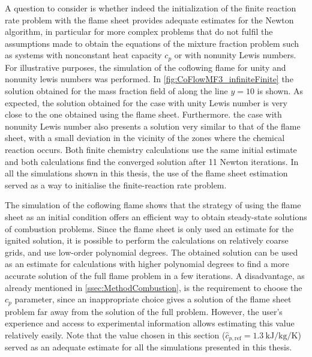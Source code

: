 A question to consider is whether indeed the initialization of the finite reaction rate problem with the flame sheet provides adequate estimates for the Newton algorithm, in particular for more complex problems that do not fulfil the assumptions made to obtain the equations of the mixture fraction problem such as systems with nonconstant heat capacity $c_p$ or with nonunity Lewis numbers. 
For illustrative purposes, the simulation of the coflowing flame for unity and nonunity lewis numbers was performed. In \cref{fig:CoFlowMF3_infiniteFinite} the solution obtained for the mass fraction field of  along the line $y=10$ is shown. As expected, the solution obtained for the case with unity Lewis number is very close to the one obtained using the flame sheet. Furthermore. the case with nonunity Lewis number also presents a solution very similar to that of the flame sheet, with a small deviation in the vicinity of the zones where the chemical reaction occurs.  Both finite chemistry calculations use the same initial estimate and both calculations find the converged solution after 11 Newton iterations.
In all the simulations shown in this thesis, the use of the flame sheet estimation served as a way to initialise the finite-reaction rate problem.




 
 The simulation of the coflowing flame shows that the strategy of using the flame sheet as an initial condition offers an efficient way to obtain steady-state solutions of combustion problems. Since the flame sheet is only used an estimate for the ignited solution, it is possible to perform the calculations on relatively coarse grids, and use low-order polynomial degrees. The obtained solution can be used as an estimate for calculations with higher polynomial degrees to find a more accurate solution of the full flame problem in a few iterations. A disadvantage, as already mentioned in \cref{ssec:MethodCombustion}, is the requirement to choose  the $c_p$ parameter, since an inappropriate choice gives a solution of the flame sheet problem far away from the solution of the full problem. However, the user's experience and access to experimental information allows estimating this value relatively easily. Note that the value chosen in this section ($\hat{c}_{p,\text{ref}}= \SI{1.3}{\kilo \joule \per \kilo \gram \per \kelvin}$)  served as an adequate estimate for all the simulations presented in this thesis.  
 